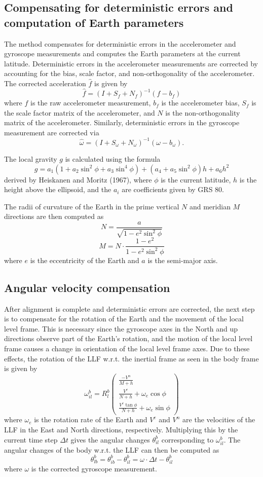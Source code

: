 \documentclass[11pt, oneside]{article}   	%
\begin{document}
\subsection{Compensating for deterministic errors and computation of Earth parameters}
The  method compensates for deterministic errors in the accelerometer and gyroscope measurements and computes the Earth parameters at the current latitude.  Deterministic errors in the accelerometer measurements are corrected by accounting for the bias, scale factor, and non-orthogonality of the accelerometer.  The corrected acceleration $\hat f$ is given by $$\hat f=(I+S_f+N_f)^{-1}(f-b_f)$$ where $f$ is the raw accelerometer measurement, $b_f$ is the accelerometer bias, $S_f$ is the scale factor matrix of the accelerometer, and $N$ is the non-orthogonality matrix of the accelerometer.  Similarly, deterministic errors in the gyroscope measurement are corrected via $$\hat \omega=(I+S_\omega+N_\omega)^{-1}(\omega-b_\omega).$$

The local gravity $g$ is calculated using the formula  $$g=a_1(1+a_2\sin^2\phi+a_3\sin^4\phi)+(a_4+a_5\sin^2\phi)h+a_6h^2$$ derived by Heiskanen and Moritz (1967), where $\phi$ is the current latitude, $h$ is the height above the ellipsoid, and the $a_i$ are coefficients given by GRS 80.

The radii of curvature of the Earth in the prime vertical $N$ and meridian $M$ directions are then computed as 
$$N=\frac{a}{\sqrt{1-e^2\sin^2\phi}}$$
$$M=N\cdot \frac{1-e^2}{1-e^2\sin^2\phi}$$
where $e$ is the eccentricity of the Earth and $a$ is the semi-major axis.

\subsection{Angular velocity compensation}

After alignment is complete and deterministic errors are corrected, the next step is to compensate for the rotation of the Earth and the movement of the local level frame.  This is necessary since the gyroscope axes in the North and up directions observe part of the Earth's rotation, and the motion of the local level frame causes a change in orientation of the local level frame axes.  Due to these effects, the rotation of the LLF w.r.t. the inertial frame as seen in the body frame is given by 
$$\omega_{il}^b=R_l^b\begin{pmatrix}
\frac{-V^n}{M+h} \\[.1cm]
\frac{V^e}{N+h}+\omega_e \cos\phi \\[.1cm]
\frac{V^e\tan\phi}{N+h}+\omega_e \sin\phi
\end{pmatrix}$$
where $\omega_e$ is the rotation rate of the Earth and $V^e$ and $V^n$ are the velocities of the LLF in the East and North directions, respectively.  Multiplying this by the current time step $\Delta t$ gives the angular changes $\theta_{il}^b$ corresponding to $\omega_{il}^b$.  The angular changes of the body w.r.t. the LLF can then be computed as $$\theta_{lb}^b=\theta_{ib}^b-\theta_{il}^b=\omega\cdot\Delta t-\theta_{il}^b$$ where $\omega$ is the corrected gyroscope measurement.
\end{document}

